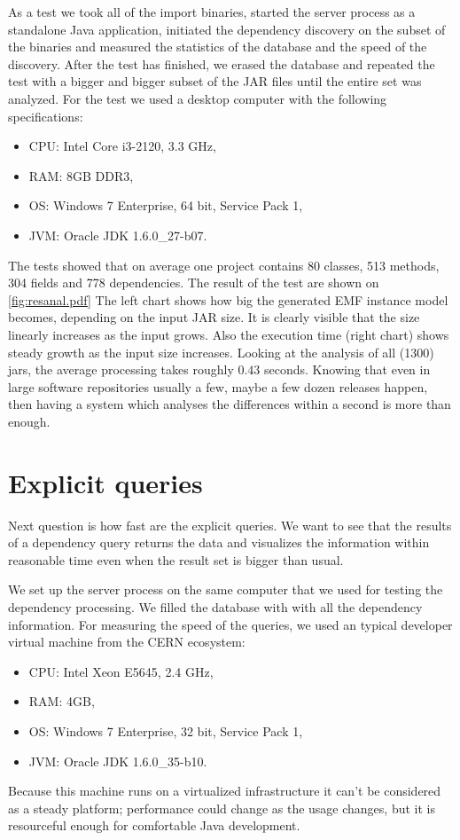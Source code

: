 As a test we took all of the import binaries, started the server process as a
standalone Java application, initiated the dependency discovery on the subset of
the binaries and measured the statistics of the database and the speed of the
discovery. After the test has finished, we erased the database and repeated the
test with a bigger and bigger subset of the JAR files until the entire set was
analyzed. For the test we used a desktop computer with the following
specifications:
\begin{itemize}
  \item CPU: Intel Core i3-2120, 3.3 GHz,
  \item RAM: 8GB DDR3,
  \item OS: Windows 7 Enterprise, 64 bit, Service Pack 1,
  \item JVM: Oracle JDK 1.6.0\_27-b07.
\end{itemize}
The tests showed that on average one project contains 80 classes, 513 methods, 304 fields and 778 dependencies. 
The result of the test are shown on \autoref{fig:resanal.pdf}
The left chart shows how big the generated EMF instance model becomes, depending
on the input JAR size. It is clearly visible that the size linearly increases as
the input grows. Also the execution time (right chart) shows steady growth as
the input size increases. Looking at the analysis
 of all (1300) jars, the average processing takes roughly $0.43$ seconds.
Knowing that even in large software repositories usually a few, maybe a few
dozen releases happen, then having a system which analyses the differences
within a second is more than enough.

\section{Explicit queries}
\label{sect:explqueries}
Next question is how fast are the explicit queries. We want to see that the
results of a dependency query returns the data and visualizes the information
within reasonable time even when the result set is bigger than usual. 

We set up the server process on the same computer that we used for testing the
dependency processing. We filled the database with with all the dependency
information. For measuring the speed of the queries, we used an typical
developer virtual machine from the CERN ecosystem:
\begin{itemize}
  \item CPU: Intel Xeon E5645, 2.4 GHz,
  \item RAM: 4GB,
  \item OS: Windows 7 Enterprise, 32 bit, Service Pack 1,
  \item JVM: Oracle JDK 1.6.0\_35-b10.
\end{itemize}
Because this machine runs on a virtualized infrastructure it can't be considered
as a steady platform; performance could change as the usage changes, but it is
resourceful enough for comfortable Java development.

